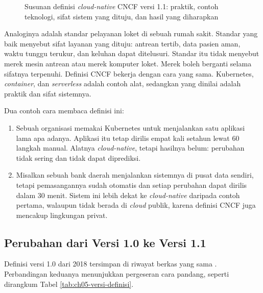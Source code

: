 \begin{figure}[!htb]
  \centering
  
  \caption{Susunan definisi \textit{cloud-native} CNCF versi 1.1: praktik, contoh
           teknologi, sifat sistem yang dituju, dan hasil yang diharapkan}
  \label{fig:ch05-definisi-cncf}
\end{figure}

Analoginya adalah standar pelayanan loket di sebuah rumah sakit. Standar yang baik menyebut
sifat layanan yang dituju: antrean tertib, data pasien aman, waktu tunggu terukur, dan
keluhan dapat ditelusuri. Standar itu tidak menyebut merek mesin antrean atau merek komputer
loket. Merek boleh berganti selama sifatnya terpenuhi. Definisi CNCF bekerja dengan cara
yang sama. Kubernetes, \textit{container}, dan \textit{serverless} adalah contoh alat,
sedangkan yang dinilai adalah praktik dan sifat sistemnya.

Dua contoh cara membaca definisi ini:
\begin{enumerate}
  \item Sebuah organisasi memakai Kubernetes untuk menjalankan satu aplikasi lama apa
        adanya. Aplikasi itu tetap dirilis empat kali setahun lewat 60 langkah manual.
        Alatnya \textit{cloud-native}, tetapi hasilnya belum: perubahan tidak sering dan
        tidak dapat diprediksi.
  \item Misalkan sebuah bank daerah menjalankan sistemnya di pusat data sendiri, tetapi
        pemasangannya sudah otomatis dan setiap perubahan dapat dirilis dalam 30 menit.
        Sistem ini lebih dekat ke \textit{cloud-native} daripada contoh pertama, walaupun
        tidak berada di \textit{cloud} publik, karena definisi CNCF juga mencakup
        lingkungan privat.
\end{enumerate}

\subsection{Perubahan dari Versi 1.0 ke Versi 1.1}

Definisi versi 1.0 dari 2018 tersimpan di riwayat berkas yang sama \cite{cncf-definition}.
Perbandingan keduanya menunjukkan pergeseran cara pandang, seperti dirangkum Tabel
\ref{tab:ch05-versi-definisi}.

